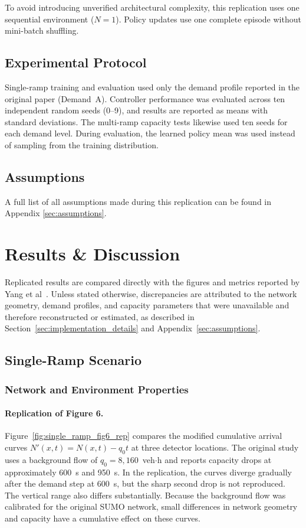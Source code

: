 To avoid introducing unverified architectural complexity, this replication uses one sequential environment ($N=1$). Policy updates use one complete episode without mini-batch shuffling.

\subsection{Experimental Protocol}

Single-ramp training and evaluation used only the demand profile reported in the original paper (Demand~A). Controller performance was evaluated across ten independent random seeds (0--9), and results are reported as means with standard deviations. The multi-ramp capacity tests likewise used ten seeds for each demand level. During evaluation, the learned policy mean was used instead of sampling from the training distribution.


\subsection{Assumptions}

A full list of all assumptions made during this replication can be found in Appendix \ref{sec:assumptions}.

\section{Results \& Discussion}
\label{sec:results}

Replicated results are compared directly with the figures and metrics reported by Yang et al~\cite{Yang2025Reinforcement}. Unless stated otherwise, discrepancies are attributed to the network geometry, demand profiles, and capacity parameters that were unavailable and therefore reconstructed or estimated, as described in Section~\ref{sec:implementation_details} and Appendix~\ref{sec:assumptions}.

\subsection{Single-Ramp Scenario}

\subsubsection{Network and Environment Properties}

\paragraph{Replication of Figure 6.} Figure~\ref{fig:single_ramp_fig6_rep} compares the modified cumulative arrival curves $N'(x,t)=N(x,t)-q_0t$ at three detector locations. The original study uses a background flow of $q_0=8{,}160$~veh$\cdot$h and reports capacity drops at approximately 600~s and 950~s. In the replication, the curves diverge gradually after the demand step at 600~s, but the sharp second drop is not reproduced. The vertical range also differs substantially. Because the background flow was calibrated for the original SUMO network, small differences in network geometry and capacity have a cumulative effect on these curves.

